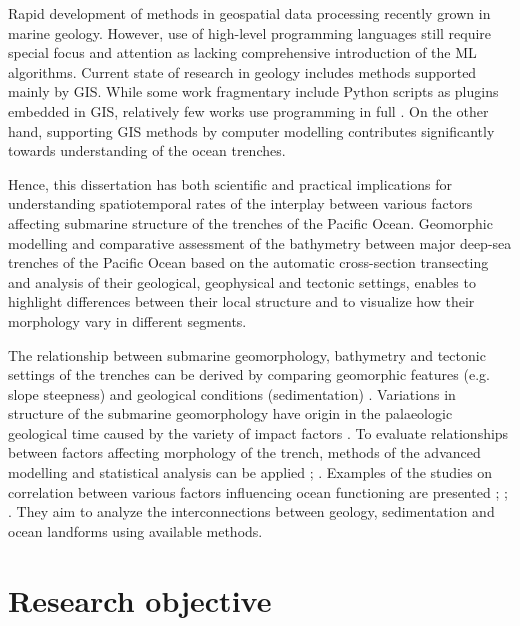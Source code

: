 \documentclass[11pt,a4paper]{report}
\begin{document}
Rapid development of methods in geospatial data processing recently grown in marine geology. However, use of high-level programming languages still require special focus and attention as lacking comprehensive introduction of the \ac{ML} algorithms. Current state of research in geology includes methods supported mainly by \ac{GIS}. While some work fragmentary include Python scripts as plugins embedded in \ac{GIS}, relatively few works use programming in full \cite{Skoienetal2014}. On the other hand, supporting \ac{GIS} methods by computer modelling contributes significantly towards understanding of the ocean trenches. 

Hence, this dissertation has both scientific and practical implications for understanding spatiotemporal rates of the interplay between various factors affecting submarine structure of the trenches of the Pacific Ocean. Geomorphic modelling and comparative assessment of the bathymetry between major deep-sea trenches of the Pacific Ocean based on the automatic cross-section transecting and analysis of their geological, geophysical and tectonic settings, enables to highlight differences between their local structure and to visualize how their morphology vary in different segments. 

The relationship between submarine geomorphology, bathymetry and tectonic settings of the trenches can be derived by comparing geomorphic features (e.g. slope steepness) and geological conditions (sedimentation) \cite{Lemenkova202008}. Variations in structure of the submarine geomorphology have origin in the palaeologic geological time caused by the variety of impact factors \cite{SenoMaruyama1984}. To evaluate relationships between factors affecting morphology of the trench, methods of the advanced modelling and statistical analysis can be applied \cite{JournelHuijbregts}; \cite{SwanSandilands1995}. Examples of the studies on correlation between various factors influencing ocean functioning are presented \cite{MillimanSyvitski}; \cite{SeekingsTeng1977}; \cite{Gorini2009}. They aim to analyze the interconnections between geology, sedimentation and ocean landforms using available methods. 

\pagebreak
\section{Research objective}
\end{document}
